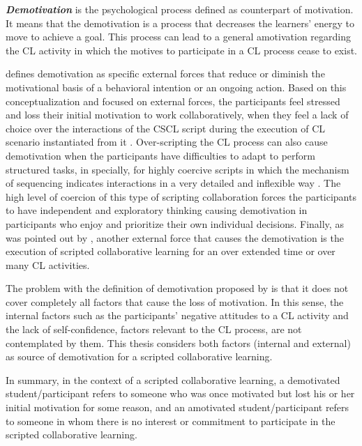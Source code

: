 \textbf{\emph{Demotivation}} is the psychological process defined as counterpart of motivation.
It means that the demotivation is a process that decreases the learners' energy to move to achieve a goal.
This process can lead to a general amotivation regarding the CL activity in which the motives to participate in a CL process cease to exist.

 defines demotivation as specific external forces that reduce or diminish the motivational basis of a behavioral intention or an ongoing action.
Based on this conceptualization and focused on external forces, the participants feel stressed and loss their initial motivation to work collaboratively, when they feel a lack of choice over the interactions of the CSCL script during the execution of CL scenario instantiated from it \cite{Isotani2009}.
Over-scripting the CL process can also cause demotivation when the participants have difficulties to adapt to perform structured tasks, in specially, for highly coercive scripts in which the mechanism of sequencing indicates interactions in a very detailed and inflexible way \cite{Dillenbourg2002}.
The high level of coercion of this type of scripting collaboration forces the participants to have independent and exploratory thinking causing demotivation in participants who enjoy and prioritize their own individual decisions.
Finally, as was pointed out by , another external force that causes the demotivation is the execution of scripted collaborative learning for an over extended time or over many CL activities.

The problem with the definition of demotivation proposed by  is that it does not cover completely all factors that cause the loss of motivation.
In this sense, the internal factors such as the participants' negative attitudes to a CL activity and the lack of self-confidence, factors relevant to the CL process, are not contemplated by them.
This thesis considers both factors (internal and external) as source of demotivation for a scripted collaborative learning.

In summary, in the context of a scripted collaborative learning, a demotivated student/participant refers to someone who was once motivated but lost his or her initial motivation for some reason, and an amotivated student/participant refers to someone in whom there is no interest or commitment to participate in the scripted collaborative learning.



